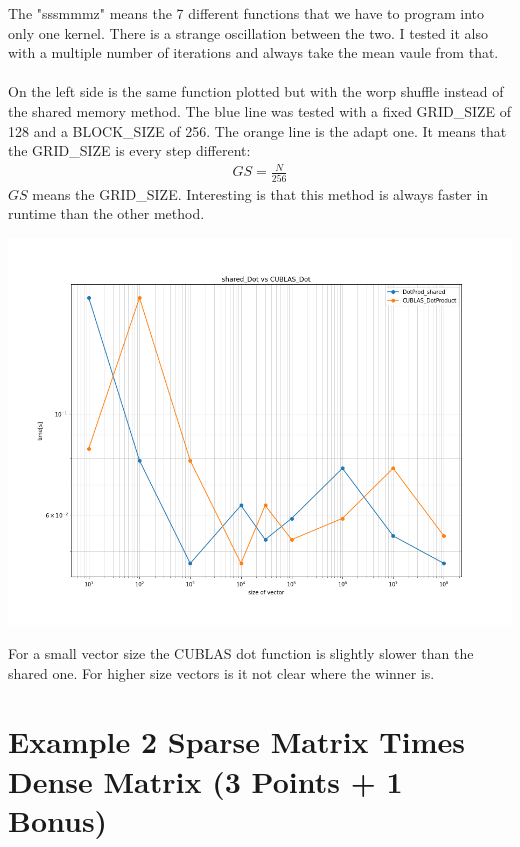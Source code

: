 \documentclass[11pt,a4paper]{article}
\begin{document}
The "sssmmmz" means the 7 different functions that we have to program into only one kernel. There is a strange oscillation between the two. I tested it also with a multiple number of iterations and always take the mean vaule from that.\\\\
On the left side is the same function plotted but with the worp shuffle instead of the shared memory method. The blue line was tested with a fixed GRID\_SIZE of 128 and a BLOCK\_SIZE of 256. The orange line is the adapt one. It means that the GRID\_SIZE is every step different:
\begin{align*}
GS = \frac{N}{256}
\end{align*}
$GS$ means the GRID\_SIZE. Interesting is that this method is always faster in runtime than the other method.
\begin{center}
	
	\begin{minipage}[t]{0.49\textwidth}
		\includegraphics[width=\textwidth]{Bilder/shared_Dot_vs_CUBLAS_Dot}
	\end{minipage}
	
\end{center}
For a small vector size the CUBLAS dot function is slightly slower than the shared one. For higher size vectors is it not clear where the winner is.
\newpage
 \section*{Example 2 Sparse Matrix Times Dense Matrix (3 Points + 1 Bonus)}
\end{document}

